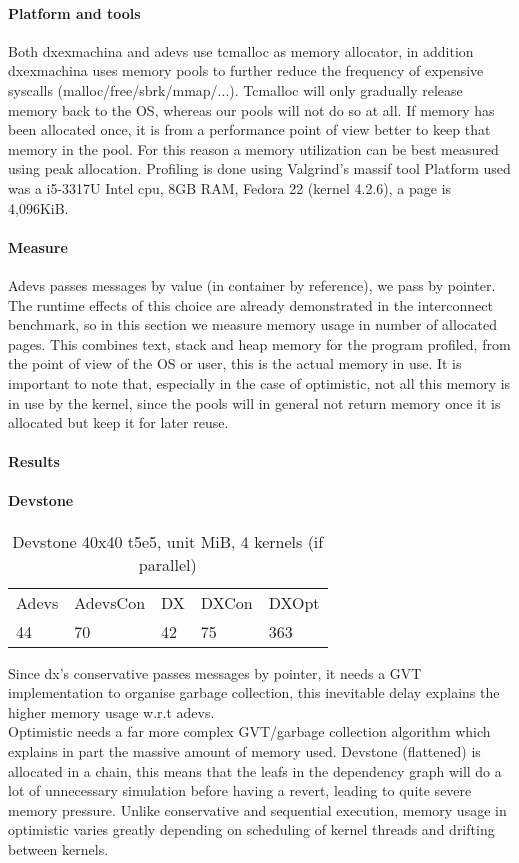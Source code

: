 \paragraph*{Platform and tools}
Both dxexmachina and adevs use tcmalloc as memory allocator, in addition dxexmachina uses memory pools to further reduce the frequency of expensive syscalls (malloc/free/sbrk/mmap/...). Tcmalloc will only gradually release memory back to the OS, whereas our pools will not do so at all. If memory has been allocated once, it is from a performance point of view better to keep that memory in the pool. For this reason a memory utilization can be best measured using peak allocation. Profiling is done using Valgrind's massif tool \cite{Nethercote:2007:VFH:1273442.1250746}
Platform used was a i5-3317U Intel cpu, 8GB RAM, Fedora 22 (kernel 4.2.6), a page is 4,096KiB.\\
\paragraph*{Measure}
Adevs passes messages by value (in container by reference), we pass by pointer. The runtime effects of this choice are already demonstrated in the interconnect benchmark, so in this section we measure memory usage in number of allocated pages. This combines text, stack and heap memory for the program profiled, from the point of view of the OS or user, this is the actual memory in use. It is important to note that, especially in the case of optimistic, not all this memory is in use by the kernel, since the pools will in general not return memory once it is allocated but keep it for later reuse.
\paragraph*{Results}
\paragraph*{Devstone}
\begin{table}[lhtb]
	\centering
	\caption{Devstone 40x40 t5e5, unit MiB, 4 kernels (if parallel)}
	\label{dtone_mem}
	\begin{tabular}{lllll}
		Adevs & AdevsCon &DX &DXCon &DXOpt\\
		44 & 70 & 42 & 75 & 363  \\
	\end{tabular}
\end{table}
Since dx's conservative passes messages by pointer, it needs a GVT implementation to organise garbage collection, this inevitable delay explains the higher memory usage w.r.t adevs.\\
Optimistic needs a far more complex GVT/garbage collection algorithm which explains in part the massive amount of memory used. Devstone (flattened) is allocated in a chain, this means that the leafs in the dependency graph will do a lot of unnecessary simulation before having a revert, leading to quite severe memory pressure. Unlike conservative and sequential execution, memory usage in optimistic varies greatly depending on scheduling of kernel threads and drifting between kernels. 
